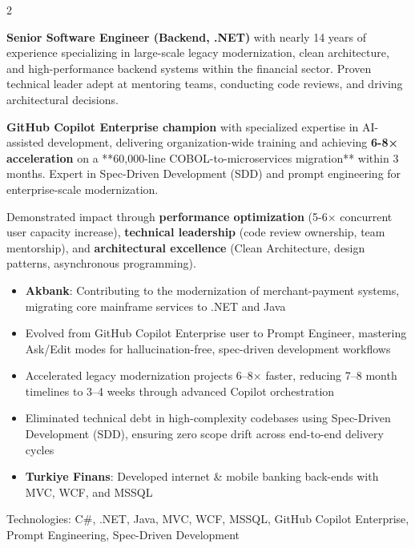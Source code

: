 \documentclass[10pt,a4paper,ragged2e,withhyper]{altacv}
\begin{document}


\makecvheader
{}

\begin{paracol}{2}



\textbf{Senior Software Engineer (Backend, .NET)} with nearly 14 years of experience specializing in large-scale legacy modernization, 
clean architecture, and high-performance backend systems within the financial sector. Proven technical leader 
adept at mentoring teams, conducting code reviews, and driving architectural decisions.

\textbf{GitHub Copilot Enterprise champion} with specialized expertise in AI-assisted development, delivering 
organization-wide training and achieving \textbf{6-8× acceleration} on a **60,000-line COBOL-to-microservices 
migration** within 3 months. Expert in Spec-Driven Development (SDD) and prompt engineering for 
enterprise-scale modernization.

Demonstrated impact through \textbf{performance optimization} (5-6× concurrent user capacity increase), 
\textbf{technical leadership} (code review ownership, team mentorship), and \textbf{architectural excellence} 
(Clean Architecture, design patterns, asynchronous programming).



\begin{itemize}
  \item \textbf{Akbank}: Contributing to the modernization of merchant-payment systems, migrating core mainframe services to .NET and Java
  \item Evolved from GitHub Copilot Enterprise user to Prompt Engineer, mastering Ask/Edit modes for hallucination-free, spec-driven development workflows
  \item Accelerated legacy modernization projects 6–8× faster, reducing 7–8 month timelines to 3–4 weeks through advanced Copilot orchestration
  \item Eliminated technical debt in high-complexity codebases using Spec-Driven Development (SDD), ensuring zero scope drift across end-to-end delivery cycles
  \item \textbf{Turkiye Finans}: Developed internet \& mobile banking back-ends with MVC, WCF, and MSSQL
\end{itemize}
Technologies: C\#, .NET, Java, MVC, WCF, MSSQL, GitHub Copilot Enterprise, Prompt Engineering, Spec-Driven Development




\end{paracol}
\end{document}
